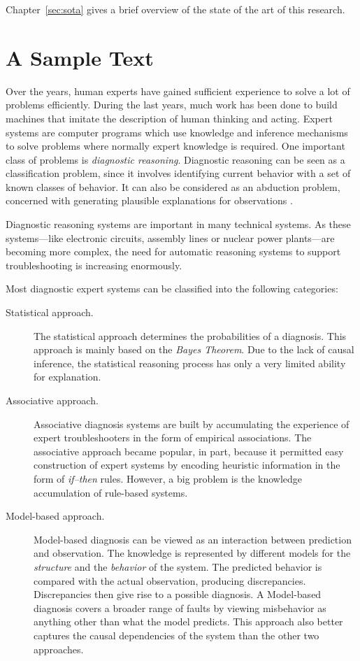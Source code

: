 
Chapter~\ref{sec:sota} gives a brief overview of the state of the art
of this research.

\section{A Sample Text}
 
Over the years, human experts have gained sufficient experience to 
solve a lot of problems
efficiently. During the last years, much work has been done to build
machines that imitate the description of human thinking and acting.
Expert systems are computer programs which use knowledge and inference
mechanisms to solve problems where normally expert knowledge is required.
One important class of problems is {\em diagnostic reasoning}.
Diagnostic reasoning can be seen as a classification problem, since it involves
identifying current behavior with a set of known classes of behavior. It can 
also be considered as an abduction problem, concerned with generating plausible
explanations for observations \cite{Kui86}.

Diagnostic reasoning systems are important in many technical systems.
As these systems---like electronic circuits, assembly 
lines or nuclear power plants---are becoming more complex, the need for 
automatic reasoning systems to support troubleshooting is increasing 
enormously.

Most diagnostic expert systems can be classified into the following categories:

\begin{description}
\item[Statistical approach.]
The statistical approach determines the probabilities of a diagnosis. This 
approach is mainly based on the {\em Bayes Theorem\/}. Due to the lack of 
causal inference, the statistical reasoning process has only a very limited 
ability for explanation.

\item[Associative approach.]
Associative diagnosis systems are built by accumulating the experience of
expert troubleshooters in the form of empirical associations. The associative
approach became popular, in part, because it permitted easy construction of 
expert systems by encoding heuristic information in the form of 
{\em if--then\/} rules. However, a big problem is the knowledge accumulation
of rule-based systems.

\item[Model-based approach.]
Model-based diagnosis can be viewed as an interaction between prediction and
observation. The knowledge is represented by different models for the 
{\em structure\/} and the {\em behavior\/} of the system. The predicted 
behavior is compared with the actual observation, producing  
discrepancies. Discrepancies then give rise to a possible diagnosis.
A Model-based diagnosis covers a broader range of faults by viewing misbehavior
as anything other than what the model predicts. This approach also better
captures the causal dependencies of the system than the other two approaches.
\end{description}


